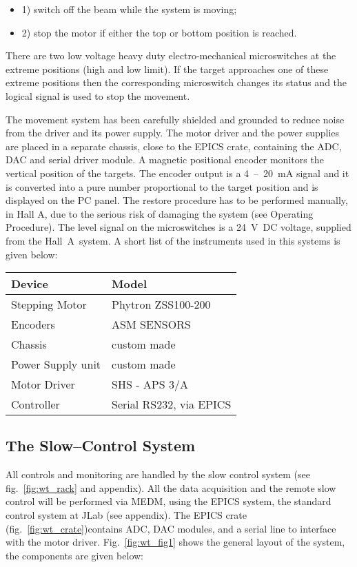 \begin{itemize}
\item 1) switch off the beam while the system is moving; 
\item 2) stop the motor if either the top or bottom position is reached. 
\end{itemize}
There are two low voltage heavy duty electro-mechanical microswitches
at the extreme positions (high and low limit). If the target approaches
one of these extreme positions then the corresponding microswitch
changes its status and the logical signal is used to stop the movement.

The movement system has been carefully shielded and grounded to reduce
noise from the driver and its power supply. The motor driver and the
power supplies are placed in a separate chassis, close to the EPICS
crate, containing the ADC, DAC and serial driver module. A magnetic
positional encoder monitors the vertical position of the targets.
The encoder output is a 4~--~20~mA signal and it is converted into
a pure number proportional to the target position and is displayed
on the PC panel. The restore procedure has to be performed manually,
in Hall A, due to the serious risk of damaging the system (see Operating
Procedure). The level signal on the microswitches is a 24~V~DC voltage,
supplied from the Hall~A~system. A short list of the instruments
used in this systems is given below: 

\begin{center}\begin{tabular}{ll}
\hline 
Device &
 Model \\
\hline
Stepping Motor &
 Phytron ZSS100-200 \\
 Encoders &
 ASM SENSORS \\
 Chassis &
 custom made \\
 Power Supply unit &
 custom made \\
 Motor Driver &
 SHS - APS 3/A \\
 Controller &
 Serial RS232, via EPICS  \\
\hline
\end{tabular}\end{center}


\subsection{The Slow--Control System}

All controls and monitoring are handled by the slow control system
(see fig.~\ref{fig:wt_rack} and appendix). All the data acquisition and
the remote slow control will be performed via MEDM, using the EPICS
system, the standard control system at JLab (see appendix). The EPICS
crate (fig.~\ref{fig:wt_crate})contains ADC, DAC modules, and a serial
line to interface with the motor driver. Fig.~\ref{fig:wt_fig1} shows the
general layout of the system, the components are given below:


